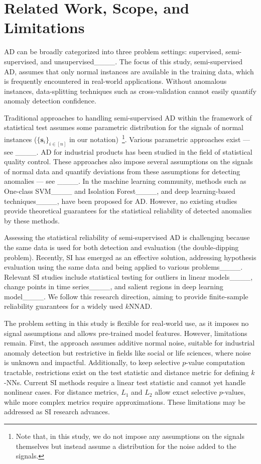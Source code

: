 \section{Related Work, Scope, and Limitations}
\label{sec:relatedWorks}
%
AD can be broadly categorized into three problem settings: supervised, semi-supervised, and unsupervised____.
%
The focus of this study, semi-supervised AD, assumes that only normal instances are available in the training data, which is frequently encountered in real-world applications.
%
Without anomalous instances, data-splitting techniques such as cross-validation cannot easily quantify anomaly detection confidence.

Traditional approaches to handling semi-supervised AD within the framework of statistical test assumes some parametric distribution for the signals of normal instances ($\{\bm{s}_i\}_{i \in [n]}$ in our notation)~\footnote{Note that, in this study, we do not impose any assumptions on the signals themselves but instead assume a distribution for the noise added to the signals.}.
%
Various parametric approaches exist --- see ____.
%
AD for industrial products has been studied in the field of statistical quality control.
%
These approaches also impose several assumptions on the signals of normal data and quantify deviations from these assumptions for detecting anomalies --- see ____.
%
In the machine learning community, methods such as One-class SVM____ and Isolation Forest____, and deep learning-based techniques____, have been proposed for AD. 
%
However, no existing studies provide theoretical guarantees for the statistical reliability of detected anomalies by these methods. 

Assessing the statistical reliability of semi-supervised AD is challenging because the same data is used for both detection and evaluation (the double-dipping problem).
%
Recently, SI has emerged as an effective solution, addressing hypothesis evaluation using the same data and being applied to various problems____.
%
Relevant SI studies include statistical testing for outliers in linear models____, change points in time series____, and salient regions in deep learning model____.
%
We follow this research direction, aiming to provide finite-sample reliability guarantees for a widely used $k$NNAD.

The problem setting in this study is flexible for real-world use, as it imposes no signal assumptions and allows pre-trained model features.
%
However, limitations remain.
%
First, the approach assumes additive normal noise, suitable for industrial anomaly detection but restrictive in fields like social or life sciences, where noise is unknown and impactful.
%
Additionally, to keep selective $p$-value computation tractable, restrictions exist on the test statistic and distance metric for defining $k$-NNs.
%
Current SI methods require a linear test statistic and cannot yet handle nonlinear cases.
%
For distance metrics, $L_1$ and $L_2$ allow exact selective $p$-values, while more complex metrics require approximations.
%
These limitations may be addressed as SI research advances.